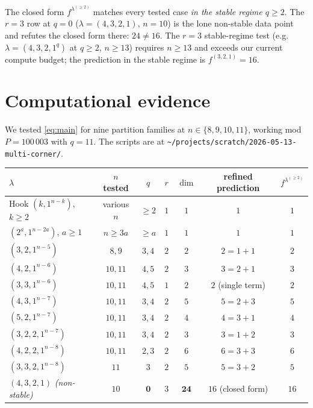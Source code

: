 \documentclass[11pt]{article}
\theoremstyle{definition}
\begin{document}
\noindent The closed form $f^{\lambda^{(\ge 2)}}$ matches every tested
case \emph{in the stable regime $q \ge 2$}. The $r = 3$ row at $q = 0$
($\lambda = (4, 3, 2, 1)$, $n = 10$) is the lone non-stable data point
and refutes the closed form there: $24 \ne 16$. The $r = 3$
stable-regime test (e.g.\ $\lambda = (4, 3, 2, 1^q)$ at $q \ge 2$,
$n \ge 13$) requires $n \ge 13$ and exceeds our current compute budget;
the prediction in the stable regime is $f^{(3, 2, 1)} = 16$.

\section{Computational evidence}\label{sec:evidence}

We tested \eqref{eq:main} for nine partition families at
$n \in \{8, 9, 10, 11\}$, working mod $P = 100\,003$ with $q = 11$. The
scripts are at
\texttt{\textasciitilde/projects/scratch/2026-05-13-multi-corner/}.

\begin{center}
\begin{tabular}{lcccccc}
\toprule
$\lambda$ & $n$ tested & $q$ & $r$ & $\dim$ & refined prediction & $f^{\lambda^{(\ge 2)}}$\\
\midrule
Hook $(k, 1^{n-k})$, $k \ge 2$ & various $n$ & $\ge 2$ & $1$ & $1$ & $1$ & $1$\\
$(2^a, 1^{n-2a})$, $a \ge 1$ & $n \ge 3a$ & $\ge a$ & $1$ & $1$ & $1$ & $1$\\
$(3, 2, 1^{n-5})$ & $8, 9$ & $3, 4$ & $2$ & $2$ & $2 = 1 + 1$ & $2$\\
$(4, 2, 1^{n-6})$ & $10, 11$ & $4, 5$ & $2$ & $3$ & $3 = 2 + 1$ & $3$\\
$(3, 3, 1^{n-6})$ & $10, 11$ & $4, 5$ & $1$ & $2$ & $2$ (single term) & $2$\\
$(4, 3, 1^{n-7})$ & $10, 11$ & $3, 4$ & $2$ & $5$ & $5 = 2 + 3$ & $5$\\
$(5, 2, 1^{n-7})$ & $10, 11$ & $3, 4$ & $2$ & $4$ & $4 = 3 + 1$ & $4$\\
$(3, 2, 2, 1^{n-7})$ & $10, 11$ & $3, 4$ & $2$ & $3$ & $3 = 1 + 2$ & $3$\\
$(4, 2, 2, 1^{n-8})$ & $10, 11$ & $2, 3$ & $2$ & $6$ & $6 = 3 + 3$ & $6$\\
$(3, 3, 2, 1^{n-8})$ & $11$ & $3$ & $2$ & $5$ & $5 = 3 + 2$ & $5$\\
\midrule
$(4, 3, 2, 1)$ \emph{(non-stable)} & $10$ & $\mathbf{0}$ & $3$ & $\mathbf{24}$ & $16$ (closed form) & $16$\\
\bottomrule
\end{tabular}
\end{center}
\end{document}
